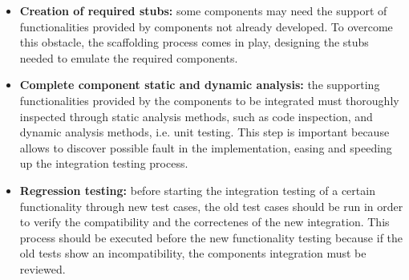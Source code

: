 \begin{itemize}
	\item \textbf{Creation of required stubs:} some components may need the support of functionalities provided by components not already developed. To overcome this obstacle, the scaffolding process comes in play, designing the stubs needed to emulate the required components. 
	\item \textbf{Complete component static and dynamic analysis:} the supporting functionalities provided by the components to be integrated must thoroughly inspected through static analysis methods, such as code inspection, and dynamic analysis methods, i.e. unit testing. This step is important because allows to discover possible fault in the implementation, easing and speeding up the integration testing process.
	\item \textbf{Regression testing:} before starting the integration testing of a certain functionality through new test cases, the old test cases should be run in order to verify the compatibility and the correctenes of the new integration. This process should be executed before the new functionality testing because if the old tests show an incompatibility, the components integration must be reviewed.
\end{itemize}
